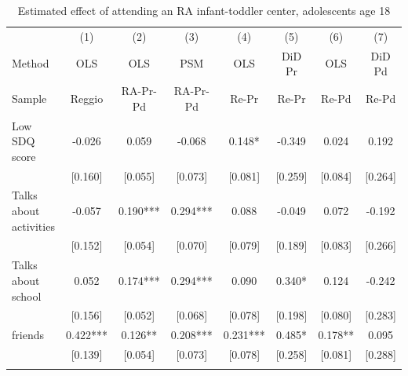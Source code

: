 \documentclass[12pt]{article}
\begin{document}
\begin{table}[ht]
\caption{Estimated effect of attending an RA infant-toddler center, adolescents age 18}

\label{tab:adoIT}
\begin{center}
\begin{adjustbox}{width=1.2\textwidth,center=\textwidth}
\small
\begin{tabular}{lccccccc}
\hline 
 & {(1) } & {(2) } & {(3) } & {(4) } & {(5) } & {(6) } & {(7) }\\
{Method } & {OLS } & {OLS } & {PSM } & {OLS } & {DiD Pr } & {OLS } & {DiD Pd }\\
{Sample } & {Reggio } & {RA-Pr-Pd } & {RA-Pr-Pd } & {Re-Pr } & {Re-Pr } & {Re-Pd } & {Re-Pd }\\
\hline 
{Low SDQ score } & {-0.026 } & {0.059 } & {-0.068 } & {0.148{*} } & {-0.349 } & {0.024 } & {0.192 }\\
 & [0.160] & [0.055] & [0.073] & [0.081] & [0.259] & [0.084] & [0.264]\\
{Talks about activities } & {-0.057 } & {0.190{*}{*}{*} } & {0.294{*}{*}{*} } & {0.088 } & {-0.049 } & {0.072 } & {-0.192 }\\
 & [0.152] & [0.054] & [0.070] & [0.079] & [0.189] & [0.083] & [0.266]\\
{Talks about school } & {0.052 } & {0.174{*}{*}{*} } & {0.294{*}{*}{*} } & {0.090 } & {0.340{*} } & {0.124 } & {-0.242 }\\
 & [0.156] & [0.052] & [0.068] & [0.078] & [0.198] & [0.080] & [0.283]\\
{%
friends } & {0.422{*}{*}{*} } & {0.126{*}{*} } & {0.208{*}{*}{*} } & {0.231{*}{*}{*} } & {0.485{*} } & {0.178{*}{*} } & {0.095 }\\
 & [0.139] & [0.054] & [0.073] & [0.078] & [0.258] & [0.081] & [0.288]\\
{%
}
\end{tabular}
\end{adjustbox}
\end{center}
\end{table}
\end{document}
